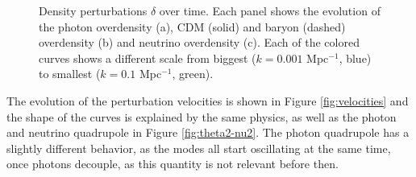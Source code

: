 \documentclass{aa}
\begin{document}
\begin{figure}[htp]
  \centering
  \quad
  \quad
\caption{Density perturbations $\delta$ over time. Each panel shows the evolution of the photon overdensity (a), CDM (solid) and baryon (dashed) overdensity (b) and neutrino overdensity (c). Each of the colored curves shows a different scale from biggest ($k = 0.001$ Mpc$^{-1}$, blue) to smallest ($k=0.1$ Mpc$^{-1}$, green).}
\label{fig:densities}
\end{figure}

The evolution of the perturbation velocities is shown in Figure \ref{fig:velocities} and the shape of the curves is explained by the same physics, as well as the photon and neutrino quadrupole in Figure \ref{fig:theta2-nu2}. The photon quadrupole has a slightly different behavior, as the modes all start oscillating at the same time, once photons decouple, as this quantity is not relevant before then.
\end{document}
